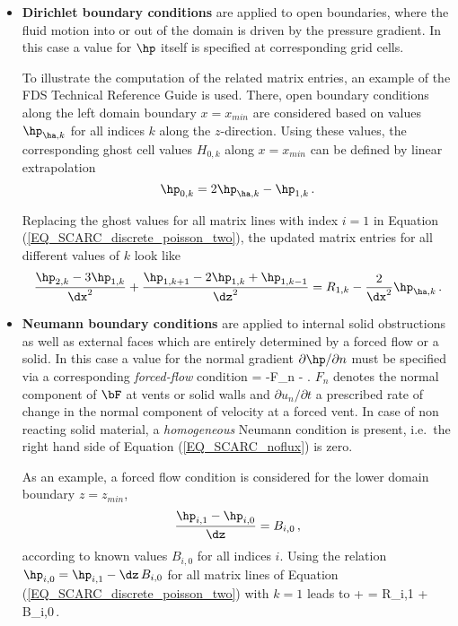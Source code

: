 \begin{itemize}
\item{\bf Dirichlet boundary conditions}
are applied to open boundaries, where the fluid motion into or out of the domain is driven by the pressure gradient. In this case a value for $\hp$ itself is specified at corresponding grid cells. 

To illustrate the computation of the related matrix entries, an example of the FDS Technical Reference Guide \cite{McGrattan:2018:TG} is used. There, open boundary conditions along the left domain boundary $x = x_{min}$ are considered based on values $\hp_{\ha,k}$ for all indices $k$ along the $z$-direction.
Using these values, the corresponding ghost cell values $H_{0,k}$ along $x = x_{min}$ can be defined by linear extrapolation
\[
\hp_{0,k} = 2 \hp_{\ha,k} - \hp_{1,k}\,.
\]

Replacing the ghost values for all matrix lines with index $i=1$ in Equation (\ref{EQ_SCARC_discrete_poisson_two}), the updated matrix entries for all different values of $k$ look like
\[
\frac{\hp_{2,k}-3\hp_{1,k}}{\dx^2} +
\frac{\hp_{1,k+1}-2\hp_{1,k}+\hp_{1,k-1}}{\dz^2}   
= R_{1,k} - \frac{2}{\dx^2}\hp_{\ha,k}\,.
\]

\item{\bf Neumann boundary conditions} 
are applied to internal solid obstructions as well as external faces which are entirely determined by a forced flow or a solid. In this case a value for the normal gradient $\partial \hp/\partial n$ must be specified via a corresponding {\it forced-flow} condition
\be 
   = -F_n - . 
  \label{EQ_SCARC_noflux}
\ee
$F_n$ denotes the normal component of $\bF$ at vents or solid walls and $\partial u_n/\partial t$
a prescribed rate of change in the normal component  of velocity at a forced vent. In case of non reacting solid material, a {\it homogeneous} Neumann condition is present, i.e.\ the right hand side of Equation (\ref{EQ_SCARC_noflux}) is zero.

As an example, a forced flow condition is considered for the lower domain boundary $z=z_{min}$,
\[
\frac{\hp_{i,1}-\hp_{i,0}}{\dz} = B_{i,0}\,, 
\]
according to known values $B_{i,0}$ for all indices $i$.
Using the relation $\hp_{i,0}= \hp_{i,1} - \dz \, B_{i,0}$ for all matrix lines  of Equation (\ref{EQ_SCARC_discrete_poisson_two}) with $k=1$ leads to
\be
{} +
 \notag  = R_{i,1} + B_{i,0}\,.
\ee
\end{itemize}
